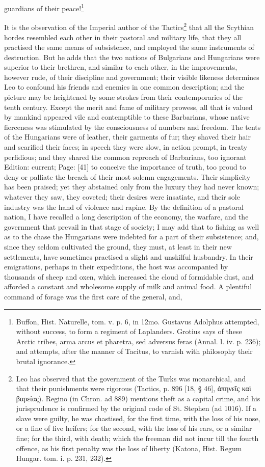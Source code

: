 guardians of their peace!\footnote{Buffon, Hist. Naturelle, tom. v. p. 6, in 12mo. Gustavus Adolphus attempted, without success, to form a regiment of Laplanders. Grotius says of these Arctic tribes, arma arcus et pharetra, sed adversus feras (Annal. l. iv. p. 236); and attempts, after the manner of Tacitus, to varnish with philosophy their brutal ignorance.}

It is the observation of the Imperial author of the Tactics\footnote{Leo has observed that the government of the Turks was monarchical, and that their punishments were rigorous (Tactics, p. 896 [18, § 46], \textgreek{\texthebrew{ἁ}πηνε\texthebrew{ῖ}ς κα\texthebrew{ὶ} βαρείας}). Regino (in Chron. ad 889) mentions theft as a capital crime, and his jurisprudence is confirmed by the original code of St. Stephen (ad 1016). If a slave were guilty, he was chastised, for the first time, with the loss of his nose, or a fine of five heifers; for the second, with the loss of his ears, or a similar fine; for the third, with death; which the freeman did not incur till the fourth offence, as his first penalty was the loss of liberty (Katona, Hist. Regum Hungar. tom. i. p. 231, 232).} that all the Scythian hordes resembled each other in their pastoral and military life, that they all practised the same means of subsistence, and employed the same instruments of destruction. But he adds that the two nations of Bulgarians and Hungarians were superior to their brethren, and similar to each other, in the improvements, however rude, of their discipline and government; their visible likeness determines Leo to confound his friends and enemies in one common description; and the picture may be heightened by some strokes from their contemporaries of the tenth century. Except the merit and fame of military prowess, all that is valued by mankind appeared vile and contemptible to these Barbarians, whose native fierceness was stimulated by the consciousness of numbers and freedom. The tents of the Hungarians were of leather, their garments of fur; they shaved their hair and scarified their faces; in speech they were slow, in action prompt, in treaty perfidious; and they shared the common reproach of Barbarians, too ignorant Edition: current; Page: [41] to conceive the importance of truth, too proud to deny or palliate the breach of their most solemn engagements. Their simplicity has been praised; yet they abstained only from the luxury they had never known; whatever they saw, they coveted; their desires were insatiate, and their sole industry was the hand of violence and rapine. By the definition of a pastoral nation, I have recalled a long description of the economy, the warfare, and the government that prevail in that stage of society; I may add that to fishing as well as to the chase the Hungarians were indebted for a part of their subsistence; and, since they seldom cultivated the ground, they must, at least in their new settlements, have sometimes practised a slight and unskilful husbandry. In their emigrations, perhaps in their expeditions, the host was accompanied by thousands of sheep and oxen, which increased the cloud of formidable dust, and afforded a constant and wholesome supply of milk and animal food. A plentiful command of forage was the first care of the general, and, 
